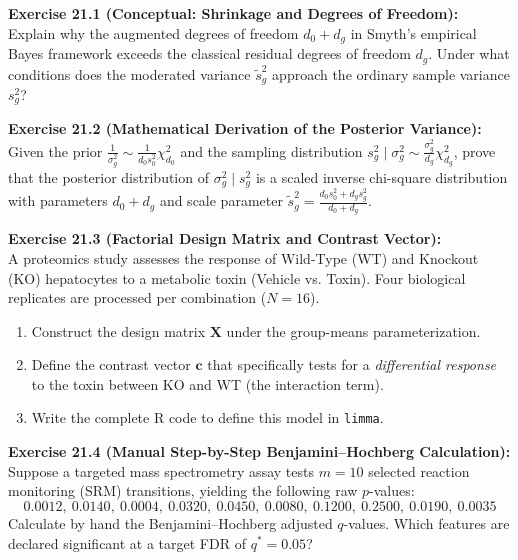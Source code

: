 \documentclass[11pt,twoside,openright]{book}
\begin{document}

\noindent
\textbf{Exercise 21.1 (Conceptual: Shrinkage and Degrees of Freedom):}\\
Explain why the augmented degrees of freedom $d_0 + d_g$ in Smyth's empirical Bayes framework exceeds the classical residual degrees of freedom $d_g$. Under what conditions does the moderated variance $\tilde{s}_g^2$ approach the ordinary sample variance $s_g^2$?

\vspace{0.5em}
\noindent
\textbf{Exercise 21.2 (Mathematical Derivation of the Posterior Variance):}\\
Given the prior $\frac{1}{\sigma_g^2} \sim \frac{1}{d_0 s_0^2} \chi^2_{d_0}$ and the sampling distribution $s_g^2 \mid \sigma_g^2 \sim \frac{\sigma_g^2}{d_g} \chi^2_{d_g}$, prove that the posterior distribution of $\sigma_g^2 \mid s_g^2$ is a scaled inverse chi-square distribution with parameters $d_0 + d_g$ and scale parameter $\tilde{s}_g^2 = \frac{d_0 s_0^2 + d_g s_g^2}{d_0 + d_g}$.

\vspace{0.5em}
\noindent
\textbf{Exercise 21.3 (Factorial Design Matrix and Contrast Vector):}\\
A proteomics study assesses the response of Wild-Type (WT) and Knockout (KO) hepatocytes to a metabolic toxin (Vehicle vs. Toxin). Four biological replicates are processed per combination ($N = 16$).
\begin{enumerate}
    \item Construct the design matrix $\mathbf{X}$ under the group-means parameterization.
    \item Define the contrast vector $\mathbf{c}$ that specifically tests for a \textit{differential response} to the toxin between KO and WT (the interaction term).
    \item Write the complete R code to define this model in \texttt{limma}.
\end{enumerate}

\vspace{0.5em}
\noindent
\textbf{Exercise 21.4 (Manual Step-by-Step Benjamini--Hochberg Calculation):}\\
Suppose a targeted mass spectrometry assay tests $m = 10$ selected reaction monitoring (SRM) transitions, yielding the following raw $p$-values:
$$0.0012, \ 0.0140, \ 0.0004, \ 0.0320, \ 0.0450, \ 0.0080, \ 0.1200, \ 0.2500, \ 0.0190, \ 0.0035$$
Calculate by hand the Benjamini--Hochberg adjusted $q$-values. Which features are declared significant at a target FDR of $q^* = 0.05$?
\end{document}
